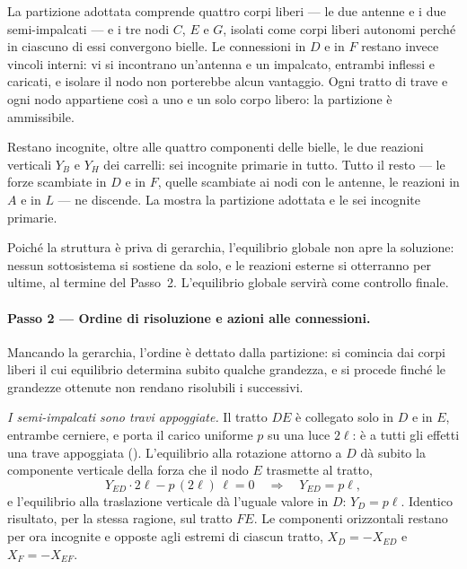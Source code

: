 La partizione adottata comprende quattro corpi liberi ---
le due antenne e i due semi-impalcati --- e i tre nodi $C$,
$E$ e $G$, isolati come corpi liberi autonomi perché in
ciascuno di essi convergono bielle. Le connessioni in $D$ e
in $F$ restano invece vincoli interni: vi si incontrano
un'antenna e un impalcato, entrambi inflessi e caricati, e
isolare il nodo non porterebbe alcun vantaggio. Ogni tratto
di trave e ogni nodo appartiene così a uno e un solo corpo
libero: la partizione è ammissibile.

Restano incognite, oltre alle quattro componenti delle
bielle, le due reazioni verticali $Y_B$ e $Y_H$ dei
carrelli: sei incognite primarie in tutto. Tutto il resto
--- le forze scambiate in $D$ e in $F$, quelle scambiate ai
nodi con le antenne, le reazioni in $A$ e in $L$ --- ne
discende. La  mostra la
partizione adottata e le sei incognite primarie.

Poiché la struttura è priva di gerarchia, l'equilibrio
globale non apre la soluzione: nessun sottosistema si
sostiene da solo, e le reazioni esterne si otterranno per
ultime, al termine del Passo~2. L'equilibrio globale
servirà come controllo finale.






\paragraph{Passo 2 --- Ordine di risoluzione e azioni alle
	connessioni.}

Mancando la gerarchia, l'ordine è dettato dalla partizione:
si comincia dai corpi liberi il cui equilibrio determina
subito qualche grandezza, e si procede finché le grandezze
ottenute non rendano risolubili i successivi.

\medskip
\noindent\emph{I semi-impalcati sono travi appoggiate.}
Il tratto $DE$ è collegato solo in $D$ e in $E$, entrambe
cerniere, e porta il carico uniforme $p$ su una luce
$2\ell$: è a tutti gli effetti una trave appoggiata
(). L'equilibrio alla rotazione
attorno a $D$ dà subito la componente verticale della forza
che il nodo $E$ trasmette al tratto,
\[
	Y_{ED}\cdot 2\ell - p\,(2\ell)\,\ell = 0
	\quad\Longrightarrow\quad
	Y_{ED} = p\ell ,
\]
e l'equilibrio alla traslazione verticale dà l'uguale valore
in $D$: $Y_D = p\ell$. Identico risultato, per la stessa
ragione, sul tratto $FE$. Le componenti orizzontali restano
per ora incognite e opposte agli estremi di ciascun tratto,
$X_D = -X_{ED}$ e $X_F = -X_{EF}$.

